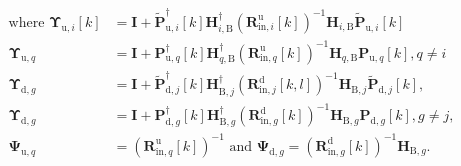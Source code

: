\documentclass[9pt,journal]{IEEEtran}
\newcommand{\bracket}[1]{{\left [{#1}\right ]}}
\newcommand{\PqB}{\mathbf{P}_{\textrm{u},q}\bracket{k}}
\newcommand{\PqBH}{\mathbf{P}^\dagger_{\textrm{u},q}\bracket{k}}
\newcommand{\PBg}{\mathbf{P}_{\textrm{d},g}\bracket{k}}
\newcommand{\PBgH}{\mathbf{P}^\dagger_{\textrm{d},g}\bracket{k}}
\newcommand{\Rinjin}{\left( \mathbf{R}^\textrm{d}_{\mathrm{in},j}\bracket{k,l}\right)^{-1}}
\newcommand{\Ringin}{\left( \mathbf{R}^\textrm{d}_{\mathrm{in},g}\bracket{k}\right)^{-1}}
\newcommand{\Riniin}{\left( \mathbf{R}^\textrm{u}_{\mathrm{in},i}\bracket{k}\right)^{-1}}
\newcommand{\Rinqin}{\left( \mathbf{R}^\textrm{u}_{\mathrm{in},q}\bracket{k}\right)^{-1}}
\newcommand{\HBj}{\mathbf{H}_{\textrm{B},j}}
\newcommand{\HBjH}{\mathbf{H}^\dagger_{\textrm{B},j}}
\newcommand{\HBg}{\mathbf{H}_{\textrm{B},g}}
\newcommand{\HBgH}{\mathbf{H}^\dagger_{\textrm{B},g}}
\newcommand{\HqB}{\mathbf{H}_{q,\textrm{B}}}
\newcommand{\HqBH}{\mathbf{H}^\dagger_{q,\textrm{B}}}
\theoremstyle{definition}
\begin{document}
\begin{align}
\textrm{where }\boldsymbol{\Upsilon}_{\textrm{u},i}\bracket{k}&=\mathbf{I}+\widetilde{\mathbf{P}}^\dagger_{\textrm{u},i}\bracket{k}\mathbf{H}^\dagger_{i,\textrm{B}}\Riniin\mathbf{H}_{i,\textrm{B}}\widetilde{\mathbf{P}}_{\textrm{u},i}\bracket{k}\nonumber\\
\boldsymbol{\Upsilon}_{\textrm{u},q}&=\mathbf{I}+\PqBH\HqBH\Rinqin \HqB\PqB,q\neq i\nonumber\\
\boldsymbol{\Upsilon}_{\textrm{d},g}&=\mathbf{I}+ \widetilde{\mathbf{P}}^\dagger_{\textrm{d},j}\bracket{k}\HBjH \Rinjin\HBj\widetilde{\mathbf{P}}_{\textrm{d},j}\bracket{k},\nonumber\\
\boldsymbol{\Upsilon}_{\textrm{d},g}&= \mathbf{I}+\PBgH\HBgH\Ringin\HBg\PBg, g\neq j,\nonumber\\
\boldsymbol{\Psi}_{\textrm{u},q}&=\Rinqin\textrm{ and }\boldsymbol{\Psi}_{\textrm{d},g}=\Ringin\HBg.\nonumber
\end{align}\normalsize
 %
\iffalse
\end{document}
